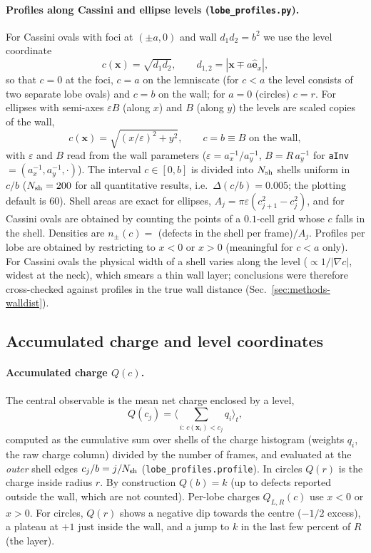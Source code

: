 \paragraph{Profiles along Cassini and ellipse levels (\texttt{lobe\_profiles.py}).}
For Cassini ovals with foci at $(\pm a,0)$ and wall $d_1d_2=b^2$ we use the level coordinate
\begin{equation}
  c(\mathbf{x}) = \sqrt{d_1 d_2},\qquad d_{1,2}=|\mathbf{x}\mp a\hat{\mathbf{e}}_x| ,
\end{equation}
so that $c=0$ at the foci, $c=a$ on the lemniscate (for $c<a$ the level consists of two
separate lobe ovals) and $c=b$ on the wall; for $a=0$ (circles) $c=r$. For ellipses with
semi-axes $\varepsilon B$ (along $x$) and $B$ (along $y$) the levels are scaled copies of the
wall,
\begin{equation}
  c(\mathbf{x}) = \sqrt{(x/\varepsilon)^2+y^2},\qquad c=b\equiv B \text{ on the wall},
\end{equation}
with $\varepsilon$ and $B$ read from the wall parameters ($\varepsilon = a^{-1}_x/a^{-1}_y$,
$B=R\,a^{-1}_y$ for \texttt{aInv} $=(a^{-1}_x,a^{-1}_y,\cdot)$).
The interval $c\in[0,b]$ is divided into $N_{\rm sh}$ shells uniform in $c/b$
($N_{\rm sh}=200$ for all quantitative results, i.e.\ $\Delta(c/b)=0.005$; the plotting default is
60). Shell areas are exact for ellipses, $A_j=\pi\varepsilon(c_{j+1}^2-c_j^2)$, and for
Cassini ovals are obtained by counting the points of a $0.1$-cell grid whose $c$ falls in the
shell. Densities are $n_\pm(c)=$ (defects in the shell per frame)$/A_j$. Profiles per lobe
are obtained by restricting to $x<0$ or $x>0$ (meaningful for $c<a$ only). For Cassini ovals
the physical width of a shell varies along the level ($\propto 1/|\nabla c|$, widest at the
neck), which smears a thin wall layer; conclusions were therefore cross-checked against
profiles in the true wall distance (Sec.~\ref{sec:methods-walldist}).

\subsection{Accumulated charge and level coordinates}
\label{sec:methods-Q}

\paragraph{Accumulated charge $Q(c)$.}
The central observable is the mean net charge enclosed by a level,
\begin{equation}
  Q(c_j) = \Big\langle \sum_{i:\,c(\mathbf{x}_i)<c_j} q_i \Big\rangle_t ,
\end{equation}
computed as the cumulative sum over shells of the charge histogram (weights $q_i$, the raw
charge column) divided by the number of frames, and evaluated at the \emph{outer} shell
edges $c_j/b = j/N_{\rm sh}$ (\texttt{lobe\_profiles.profile}). In circles $Q(r)$ is the
charge inside radius $r$. By construction $Q(b)=k$ (up to defects reported outside the
wall, which are not counted). Per-lobe charges $Q_{L,R}(c)$ use $x<0$ or $x>0$.
For circles, $Q(r)$ shows a negative dip towards the centre ($-1/2$ excess), a plateau
at $+1$ just inside the wall, and a jump to $k$ in the last few percent of $R$ (the layer).

